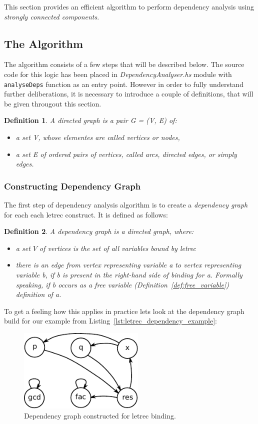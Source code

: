 \documentclass[12pt,a4paper]{report}
\newtheorem{definition}{Definition}[chapter]
\begin{document}
This section provides an efficient algorithm to perform dependency analysis
using \textit{strongly connected components}.

\subsection{The Algorithm}
The algorithm consists of a few steps that will be described below. The source
code for this logic has been placed in \textit{DependencyAnalyser.hs} module
with \texttt{analyseDeps} function as an entry point. However in order to fully
understand further deliberations, it is necessary to introduce a couple of
definitions, that will be given througout this section.
\begin{definition}
A directed graph is a pair G = (V, E) of:
\begin{itemize}
  \item a set V, whose elementes are called vertices or nodes,
  \item a set E of ordered pairs of vertices, called arcs, directed edges, or
    simply edges.
\end{itemize}
\end{definition}

\subsubsection{Constructing Dependency Graph}
The first step of dependency analysis algorithm is to create a
\textit{dependency graph} for each each letrec construct. It is
defined as follows:
\begin{definition}
A dependency graph is a directed graph, where:
\begin{itemize}
  \item a set $V$ of vertices is the set of all variables bound by
    letrec
  \item there is an edge from vertex representing variable a to vertex
    representing variable b, if b is present in the right-hand side of
    binding for a. Formally speaking, if b occurs as a free variable
    (Definition~\ref{def:free_variable}) definition of a.
\end{itemize}
\end{definition}

To get a feeling how this applies in practice lets look at the dependency graph
build for our example from Listing~\ref{lst:letrec_dependency_example}:

\vspace*{0.2in}
\begin{figure}[h!]
  \centering
  \includegraphics[height=4cm]{dependency_graph}
  \caption{Dependency graph constructed for letrec binding.}
  \label{fig:letrec_dependency_graph}
\end{figure}
\end{document}
